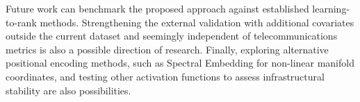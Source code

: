 \documentclass[english]{sbrt}
\begin{document}
Future work can benchmark the proposed approach against established
learning-to-rank methods. Strengthening the external validation with additional
covariates outside the current dataset and seemingly independent of
telecommunications metrics is also a possible direction of research. Finally,
exploring alternative positional encoding methods, such as Spectral Embedding
for non-linear manifold coordinates, and testing other activation functions to
assess infrastructural stability are also possibilities.



\end{document}
